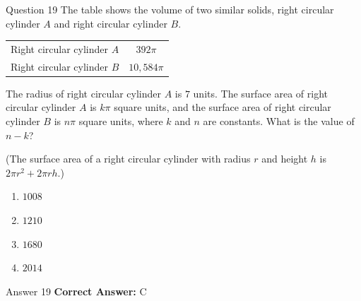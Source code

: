 \documentclass{beamer}
\begin{document}
\begin{frame}{Question 19}
\small
The table shows the volume of two similar solids, right circular cylinder \(A\) and right circular cylinder \(B\).

\begin{center}
\begin{tabular}{|l|c|}
\hline
Right circular cylinder \(A\) & \(392\pi\) \\
Right circular cylinder \(B\) & \(10{,}584\pi\) \\
\hline
\end{tabular}
\end{center}

The radius of right circular cylinder \(A\) is \(7\) units.
The surface area of right circular cylinder \(A\) is \(k\pi\) square units, and the surface area of right circular cylinder \(B\) is \(n\pi\) square units, where \(k\) and \(n\) are constants.
What is the value of \(n - k\)?

(The surface area of a right circular cylinder with radius \(r\) and height \(h\) is \(2\pi r^{2} + 2\pi rh\).)
\vspace{0.35cm}
\begin{enumerate}
    \item[A.] \(1008\)
    \item[B.] \(1210\)
    \item[C.] \(1680\)
    \item[D.] \(2014\)
\end{enumerate}
\end{frame}
\begin{frame}{Answer 19}
\small
\textbf{Correct Answer:} C
\end{frame}
\end{document}
